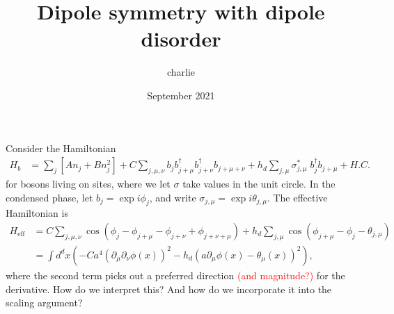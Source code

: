 \documentclass[12pt]{article}
\title{Dipole symmetry with dipole disorder}
\author{charlie}
\date{September 2021}
\newcommand{\note}[1]{\textcolor{red}{#1}}
\newcommand{\nn}{\nonumber\\}
\begin{document}
\maketitle

Consider the Hamiltonian
\begin{align}
H_b &= \sum_j \left[ A  n_j + B n_j^2 \right] + C\sum_{j,\mu,\nu}  b_j b^{\dag}_{j+\mu} b^{\dag}_{j+\nu} b_{j+\mu+\nu} + h_d \sum_{j,\mu} \sigma^*_{j,\mu}\; b^\dag_jb_{j+\mu} + H.C.
\end{align}
for bosons living on sites, where we let $\sigma$ take values in the unit circle. In the condensed phase, let $b_j = \exp i \phi_j$, and write $\sigma_{j,\mu} = \exp i \theta_{j,\mu}$. The effective Hamiltonian is
\begin{align}
H_\text{eff} &= C \sum_{j,\mu, \nu} \cos \left( \phi_j - \phi_{j+\mu} - \phi_{j+\nu} + \phi_{j+\nu+\mu} \right) + h_d \sum_{j,\mu} \cos \left( \phi_{j+\mu} - \phi_{j} - \theta_{j,\mu} \right) \nn
&= \int d^dx \left( -Ca^4 \left( \partial_\mu \partial_\nu \phi(x) \right)^2 - h_d \left(a\partial_\mu \phi (x) - \theta_\mu(x) \right)^2 \right),
\end{align}
where the second term picks out a preferred direction \note{(and magnitude?)} for the derivative. How do we interpret this? And how do we incorporate it into the scaling argument?






\end{document}
